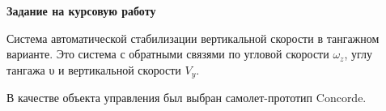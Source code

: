 \newpage
\begin{center}
    \textbf{Задание на курсовую работу}
\end{center}

Система автоматической стабилизации вертикальной скорости в тангажном варианте. Это система с обратными связями по угловой скорости $\omega_{z}$, углу тангажа υ и вертикальной скорости $V_y$.

В качестве объекта управления был выбран самолет-прототип Concorde.